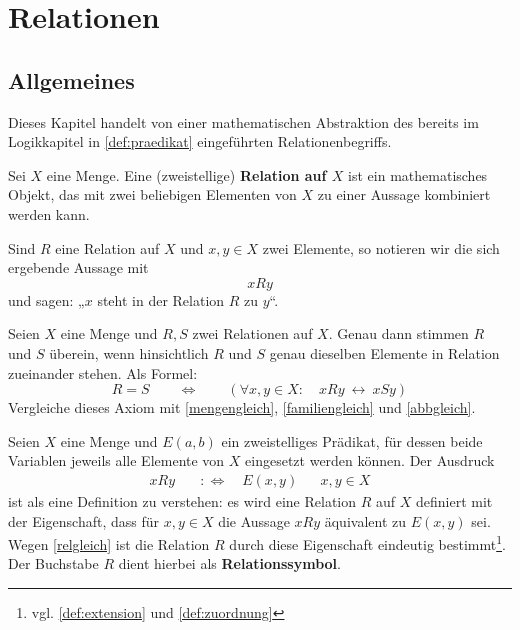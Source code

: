 



\chapter{Relationen} \label{chap:relationen}


\section{Allgemeines}


Dieses Kapitel handelt von einer mathematischen Abstraktion des bereits im Logikkapitel in \cref{def:praedikat} eingeführten Relationenbegriffs.


\begin{defin}[Relation] \label{def:relation} 
    Sei $X$ eine Menge. Eine (zweistellige) \textbf{Relation auf $X$} ist ein mathematisches Objekt, das mit zwei beliebigen Elementen von $X$ zu einer Aussage kombiniert werden kann.

    Sind $R$ eine Relation auf $X$ und $x,y\in X$ zwei Elemente, so notieren wir die sich ergebende Aussage mit
        \[ xRy \]
    und sagen: „$x$ steht in der Relation $R$ zu $y$“.
\end{defin}


\begin{axiom} \label{relgleich}
    Seien $X$ eine Menge und $R,S$ zwei Relationen auf $X$. Genau dann stimmen $R$ und $S$ überein, wenn hinsichtlich $R$ und $S$ genau dieselben Elemente in Relation zueinander stehen. Als Formel:
        \[ R=S \qquad\Leftrightarrow\qquad (\forall x,y\in X:\quad xRy\ \leftrightarrow\ xSy) \]
    Vergleiche dieses Axiom mit \cref{mengengleich}, \cref{familiengleich} und \cref{abbgleich}.
\end{axiom}


\begin{nota}
    Seien $X$ eine Menge und $E(a,b)$ ein zweistelliges Prädikat, für dessen beide Variablen jeweils alle Elemente von $X$ eingesetzt werden können. Der Ausdruck
    \begin{align*}
        xRy \quad &:\Leftrightarrow\quad E(x,y) && x,y\in X
    \end{align*}
    ist als eine Definition zu verstehen: es wird eine Relation $R$ auf $X$ definiert mit der Eigenschaft, dass für $x,y\in X$ die Aussage $xRy$ äquivalent zu $E(x,y)$ sei. Wegen \cref{relgleich} ist die Relation $R$ durch diese Eigenschaft eindeutig bestimmt\footnote{vgl. \cref{def:extension} und \cref{def:zuordnung}}. Der Buchstabe $R$ dient hierbei als \textbf{Relationssymbol}.
\end{nota}


